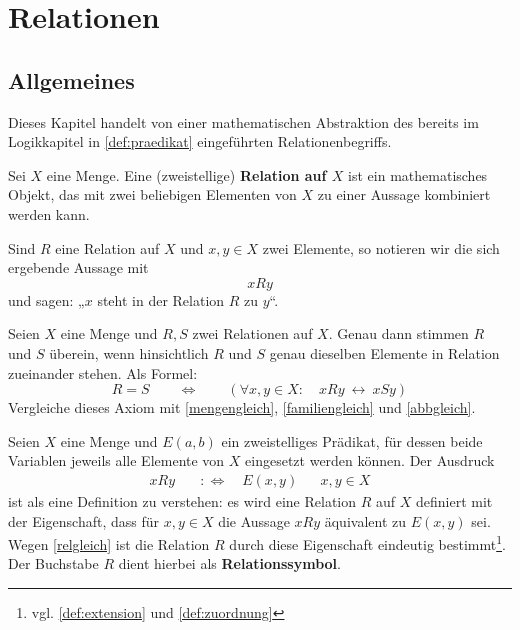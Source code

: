 



\chapter{Relationen} \label{chap:relationen}


\section{Allgemeines}


Dieses Kapitel handelt von einer mathematischen Abstraktion des bereits im Logikkapitel in \cref{def:praedikat} eingeführten Relationenbegriffs.


\begin{defin}[Relation] \label{def:relation} 
    Sei $X$ eine Menge. Eine (zweistellige) \textbf{Relation auf $X$} ist ein mathematisches Objekt, das mit zwei beliebigen Elementen von $X$ zu einer Aussage kombiniert werden kann.

    Sind $R$ eine Relation auf $X$ und $x,y\in X$ zwei Elemente, so notieren wir die sich ergebende Aussage mit
        \[ xRy \]
    und sagen: „$x$ steht in der Relation $R$ zu $y$“.
\end{defin}


\begin{axiom} \label{relgleich}
    Seien $X$ eine Menge und $R,S$ zwei Relationen auf $X$. Genau dann stimmen $R$ und $S$ überein, wenn hinsichtlich $R$ und $S$ genau dieselben Elemente in Relation zueinander stehen. Als Formel:
        \[ R=S \qquad\Leftrightarrow\qquad (\forall x,y\in X:\quad xRy\ \leftrightarrow\ xSy) \]
    Vergleiche dieses Axiom mit \cref{mengengleich}, \cref{familiengleich} und \cref{abbgleich}.
\end{axiom}


\begin{nota}
    Seien $X$ eine Menge und $E(a,b)$ ein zweistelliges Prädikat, für dessen beide Variablen jeweils alle Elemente von $X$ eingesetzt werden können. Der Ausdruck
    \begin{align*}
        xRy \quad &:\Leftrightarrow\quad E(x,y) && x,y\in X
    \end{align*}
    ist als eine Definition zu verstehen: es wird eine Relation $R$ auf $X$ definiert mit der Eigenschaft, dass für $x,y\in X$ die Aussage $xRy$ äquivalent zu $E(x,y)$ sei. Wegen \cref{relgleich} ist die Relation $R$ durch diese Eigenschaft eindeutig bestimmt\footnote{vgl. \cref{def:extension} und \cref{def:zuordnung}}. Der Buchstabe $R$ dient hierbei als \textbf{Relationssymbol}.
\end{nota}


